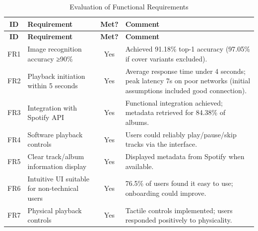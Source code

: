         \begin{longtable}{|c|p{5cm}|c|p{5cm}|}
            \caption{Evaluation of Functional Requirements} \label{tab:FR}\\
            \hline
            \textbf{ID} & \textbf{Requirement} & \textbf{Met?} & \textbf{Comment} \\
            \hline
            \endfirsthead
            \hline
            \textbf{ID} & \textbf{Requirement} & \textbf{Met?} & \textbf{Comment} \\
            \hline
            \endhead
            FR1 & Image recognition accuracy ≥90\% & Yes & Achieved 91.18\% top-1 accuracy (97.05\% if cover variants excluded). \\
            \hline
            FR2 & Playback initiation within 5 seconds & Yes & Average response time under 4 seconds; peak latency 7s on poor networks (initial assumptions included good connection). \\
            \hline
            FR3 & Integration with Spotify API & Yes & Functional integration achieved; metadata retrieved for 84.38\% of albums. \\
            \hline
            FR4 & Software playback controls & Yes & Users could reliably play/pause/skip tracks via the interface. \\
            \hline
            FR5 & Clear track/album information display & Yes & Displayed metadata from Spotify when available. \\
            \hline
            FR6 & Intuitive UI suitable for non-technical users & Yes & 76.5\% of users found it easy to use; onboarding could improve. \\
            \hline
            FR7 & Physical playback controls & Yes & Tactile controls implemented; users responded positively to physicality. \\
            \hline
        \end{longtable}
    
